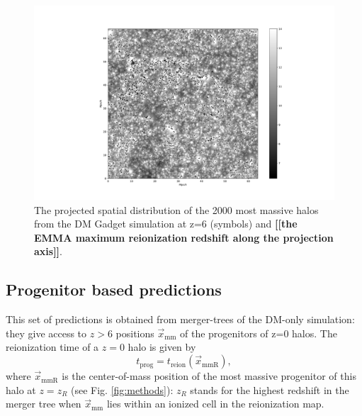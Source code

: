 \documentclass[twocolumn]{aastex61}
\newcommand{\dom}[1]{{\bf [[#1]]}}
\begin{document}


\begin{figure}[ht]
\begin{center}
\includegraphics[width=2.3 \columnwidth]{img/maphalo.pdf}
\caption{The projected spatial distribution of the 2000 most massive halos from the DM Gadget simulation at z=6 (symbols) and \dom{the EMMA maximum reionization redshift along the projection axis}.}
\end{center}
\label{fig:reion_halo_map}
\end{figure}




\subsection{Progenitor based predictions}
This set of predictions is obtained from merger-trees of the DM-only simulation: they give access to  $z>6$ positions $ \vec x_\mathrm{mm}$ of the progenitors of z=0 halos. The reionization time of a $z=0$ halo is given by
\begin{equation}
t_\mathrm{prog}=t_\mathrm{reion}(\vec x_\mathrm{mmR}),
\end{equation}
where $\vec x_\mathrm{mmR}$ is the center-of-mass position of the most massive progenitor of this halo at $z=z_R$ (see Fig. \ref{fig:methods}): $z_R$ stands for the highest redshift in the merger tree when $\vec x_\mathrm{mm}$ lies within an ionized cell in the reionization map.
\end{document}
